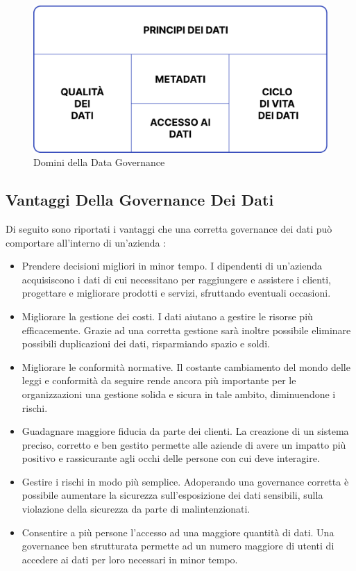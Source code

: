 \begin{figure}[!h]
    \centering
    \includegraphics[width=0.75\linewidth]{figure/capitolo_1/Data Governance Dominions.pdf}
    \caption{Domini della Data Governance}
    \label{fig:Data Governance Dominions}
\end{figure}

\subsection{Vantaggi Della Governance Dei Dati}

Di seguito sono riportati i vantaggi che una corretta governance dei dati può comportare all'interno di un'azienda \cite{google_data_governance}:
\begin{itemize}
    \item Prendere decisioni migliori in minor tempo. I dipendenti di un'azienda acquisiscono i dati di cui necessitano per raggiungere e assistere i clienti, progettare e migliorare prodotti e servizi, sfruttando eventuali occasioni.
    \item Migliorare la gestione dei costi. I dati aiutano a gestire le risorse più efficacemente. Grazie ad una corretta gestione sarà inoltre possibile eliminare possibili duplicazioni dei dati, risparmiando spazio e soldi.
    \item Migliorare le conformità normative. Il costante cambiamento del mondo delle leggi e conformità da seguire rende ancora più importante per le organizzazioni una gestione solida e sicura in tale ambito, diminuendone i rischi.
    \item Guadagnare maggiore fiducia da parte dei clienti. La creazione di un sistema preciso, corretto e ben gestito permette alle aziende di avere un impatto più positivo e rassicurante agli occhi delle persone con cui deve interagire.
    \item Gestire i rischi in modo più semplice. Adoperando una governance corretta è possibile aumentare la sicurezza sull'esposizione dei dati sensibili, sulla violazione della sicurezza da parte di malintenzionati.
    \item Consentire a più persone l'accesso ad una maggiore quantità di dati. Una governance ben strutturata permette ad un numero maggiore di utenti di accedere ai dati per loro necessari in minor tempo.
\end{itemize}


